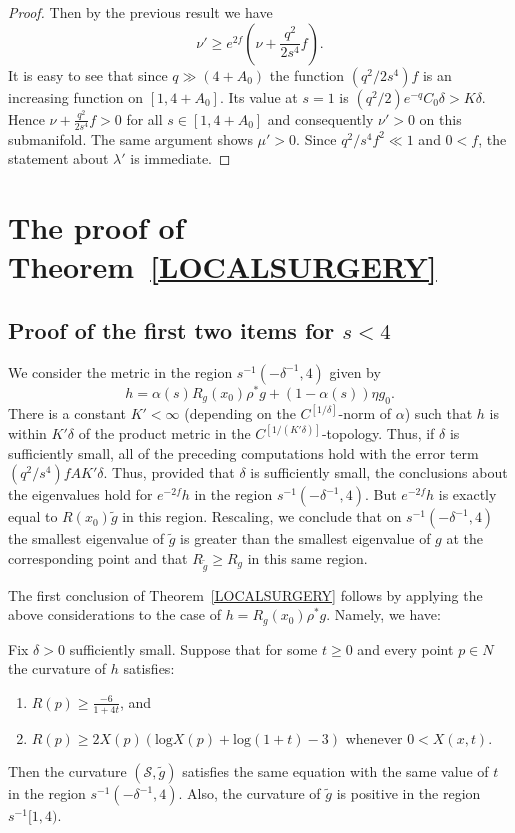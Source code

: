 \begin{proof}
Then by the previous result we have
$$\nu'\ge e^{2f}\left(\nu+\frac{q^2}{2s^4}f\right).$$
It is easy to see that since $q\gg (4+A_0)$ the function $(q^2/2s^4)f$ is an
increasing function on $[1,4+A_0]$. Its value at $s=1$ is
$(q^2/2)e^{-q}C_0\delta>K\delta$. Hence $\nu+\frac{q^2}{2s^4}f>0$ for all $s\in
[1,4+A_0]$ and consequently $\nu'>0$ on this submanifold. The same argument
shows $\mu'>0$. Since $q^2/s^4 f^2\ll 1$ and $0<f$, the statement about
$\lambda'$ is immediate.
\end{proof}





\section{The proof of Theorem~{\ref{LOCALSURGERY}}}




\subsection{Proof of the first two items for $s< 4$}

We consider the metric in the region $s^{-1}(-\delta^{-1},4)$ given by
$$h=\alpha(s)R_g(x_0)\rho^*g+(1-\alpha(s))\eta g_0.$$
There is a constant $K'<\infty$ (depending on the
$C^{[1/\delta]}$-norm of  $\alpha$) such that $h$ is within
$K'\delta$ of the product metric in the
$C^{[1/(K'\delta)]}$-topology. Thus, if $\delta$ is sufficiently
small, all of the preceding computations hold with the error term
$(q^2/s^4)fAK'\delta$. Thus, provided that $\delta$ is sufficiently
small,  the conclusions about the eigenvalues hold for $e^{-2f}h$ in
the region $s^{-1}(-\delta^{-1},4)$. But $e^{-2f}h$ is exactly equal
to $R(x_0)\tilde g$ in this region. Rescaling, we conclude that on
$s^{-1}(-\delta^{-1},4)$ the smallest eigenvalue of $\tilde g$ is
greater than the smallest eigenvalue of $g$ at the corresponding
point and that $R_{\tilde g}\ge R_{g}$ in this same region.


The first conclusion of Theorem~\ref{LOCALSURGERY}  follows by
applying the above considerations to the case of
$h=R_g(x_0)\rho^*g$. Namely, we have:

\begin{proposition}
\label{prop:pinching-preserved-s-less-4}
Fix $\delta>0$ sufficiently small. Suppose that for some $t\ge 0$
and every point $p\in N$ the curvature of $h$ satisfies:
\begin{enumerate}
\item[(1)] $R(p)\ge \frac{-6}{1+4t}$, and
\item[(2)] $R(p)\geq 2X(p)\left(\mathrm{log}X(p)+\mathrm{log}(1+t)-3\right)$ whenever $0<X(x,t)$.
\end{enumerate}

Then  the curvature $({\mathcal S},\widetilde g)$ satisfies the same
equation with the same value of $t$ in the region
$s^{-1}(-\delta^{-1},4)$. Also, the curvature of $\tilde g$ is
positive in the region $s^{-1}[1,4)$.
\end{proposition}


